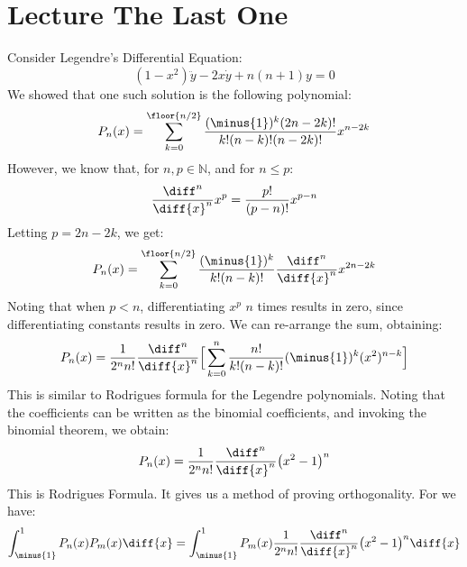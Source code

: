 \documentclass[crop=false,class=book,oneside]{standalone}
\begin{document}
    \section{Lecture The Last One}
        Consider Legendre's Differential Equation:
        \begin{equation}
            (1-x^{2})\ddot{y}-2x\dot{y}+n(n+1)y=0
        \end{equation}
        We showed that one such solution is the following
        polynomial:
        \begin{equation}
            P_{n}(x)=\sum_{k=0}^{\floor{n/2}}
                \frac{(\minus{1})^{k}(2n-2k)!}{k!(n-k)!(n-2k)!}
                    x^{n-2k}
        \end{equation}
        However, we know that, for $n,p\in\mathbb{N}$, and for
        $n\leq{p}$:
        \begin{equation}
            \frac{\diff^{n}}{\diff{x}^{n}}x^{p}=
            \frac{p!}{(p-n)!}x^{p-n}
        \end{equation}
        Letting $p=2n-2k$, we get:
        \begin{equation}
            P_{n}(x)=\sum_{k=0}^{\floor{n/2}}
                \frac{(\minus{1})^{k}}{k!(n-k)!}
                \frac{\diff^{n}}{\diff{x}^{n}}x^{2n-2k}
        \end{equation}
        Noting that when $p<n$, differentiating $x^{p}$ $n$ times
        results in zero, since differentiating constants results
        in zero. We can re-arrange the sum, obtaining:
        \begin{equation}
            P_{n}(x)=\frac{1}{2^{n}n!}\frac{\diff^{n}}{\diff{x}^{n}}
                \Big[\sum_{k=0}^{n}\frac{n!}{k!(n-k)!}
                    (\minus{1})^{k}(x^{2})^{n-k}\Big]
        \end{equation}
        This is similar to Rodrigues formula for the
        Legendre polynomials.
        Noting that the coefficients can be written as the
        binomial coefficients, and invoking the binomial theorem,
        we obtain:
        \begin{equation}
            P_{n}(x)=\frac{1}{2^{n}n!}\frac{\diff^{n}}{\diff{x}^{n}}
                \big(x^{2}-1\big)^{n}
        \end{equation}
        This is Rodrigues Formula. It gives us a method of
        proving orthogonality. For we have:
        \begin{equation}
            \int_{\minus{1}}^{1}P_{n}(x)P_{m}(x)\diff{x}
            =\int_{\minus{1}}^{1}P_{m}(x)\frac{1}{2^{n}n!}
                \frac{\diff^{n}}{\diff{x}^{n}}
                \big(x^{2}-1\big)^{n}\diff{x}
        \end{equation}
\end{document}
